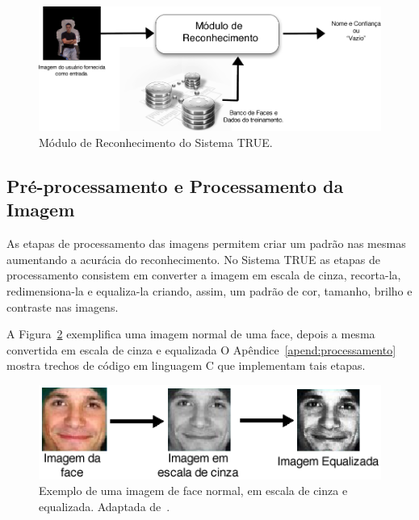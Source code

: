 		\begin{figure}[htb]
			\begin{center}
				\includegraphics[scale=2.0]{figuras/4.ProblemaEProposta/reconhecimento-simples.png}
			\end{center}
			\caption{Módulo de Reconhecimento do Sistema TRUE.}
			\label{fig:processo-reconhecimento}
		\end{figure}


	\subsection{Pré-processamento e Processamento da Imagem}
		
		As etapas de processamento das imagens permitem criar um padrão nas mesmas aumentando a acurácia do reconhecimento. No Sistema TRUE as etapas de processamento consistem em converter a imagem em escala de cinza, recorta-la, redimensiona-la e equaliza-la criando, assim, um padrão de cor, tamanho, brilho e contraste nas imagens.

		A Figura~\ref{fig:greyscale} exemplifica uma imagem normal de uma face,
		depois a mesma convertida em escala de cinza e equalizada O
		Apêndice~\ref{apend:processamento} mostra trechos de código em linguagem C
		que implementam tais etapas.

		\begin{figure}[htb]
			\begin{center}
				\includegraphics[scale=0.7]{figuras/4.ProblemaEProposta/greyscale.png}
			\end{center}
			\caption{Exemplo de uma imagem de face normal, em escala de cinza e equalizada. Adaptada de~\cite{shervin}.}
			\label{fig:greyscale}
		\end{figure}

